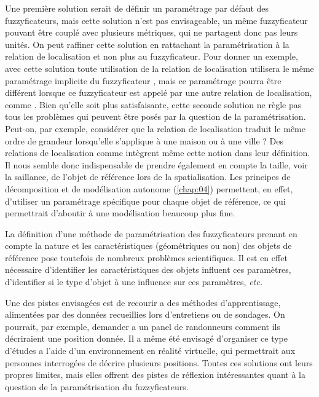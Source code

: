 Une première solution serait de définir un paramétrage par défaut des
fuzzyficateurs, mais cette solution n'est pas envisageable, un même
fuzzyficateur pouvant être couplé avec plusieurs métriques, qui ne
partagent donc pas leurs unités.
%
On peut raffiner cette solution en rattachant la paramétrisation à la
relation de localisation et non plus au fuzzyficateur. Pour donner un
exemple, avec cette solution toute utilisation de la relation de
localisation  utilisera le même paramétrage
implicite du fuzzyficateur , mais ce
paramétrage pourra être différent lorsque ce fuzzyficateur est appelé
par une autre relation de localisation, comme
. Bien qu'elle soit plus
satisfaisante, cette seconde solution ne règle pas tous les problèmes
qui peuvent être posés par la question de la paramétrisation. Peut-on,
par exemple, considérer que la relation de localisation
 traduit le même ordre de grandeur lorsqu'elle
s'applique à une maison ou à une ville ? Des relations de localisation
comme  intègrent même cette notion dans
leur définition. Il nous semble donc indispensable de prendre
également en compte la taille, voir la saillance, de l'objet de
référence lors de la spatialisation. Les principes de décomposition et
de modélisation autonome (\autoref{chap:04}) permettent, en effet,
d'utiliser un paramétrage spécifique pour chaque objet de référence,
ce qui permettrait d'aboutir à une modélisation beaucoup plus fine.

La définition d'une méthode de paramétrisation des fuzzyficateurs
prenant en compte la nature et les caractéristiques (géométriques ou
non) des objets de référence pose toutefois de nombreux problèmes
scientifiques. Il est en effet nécessaire d'identifier les
caractéristiques des objets influent ces paramètres, d'identifier si
le type d'objet à une influence sur ces paramètres, \emph{etc.}

Une des pistes envisagées est de recourir a des méthodes
d'apprentissage, alimentées par des données recueillies lors
d'entretiens ou de sondages. On pourrait, par exemple, demander a un
panel de randonneurs comment ils décriraient une position donnée. Il a
même été envisagé d'organiser ce type d'études a l'aide d'un
environnement en réalité virtuelle, qui permettrait aux personnes
interrogées de décrire plusieurs positions. Toutes ces solutions ont
leurs propres limites, mais elles offrent des pistes de réflexion
intéressantes quant à la question de la paramétrisation du
fuzzyficateurs.

